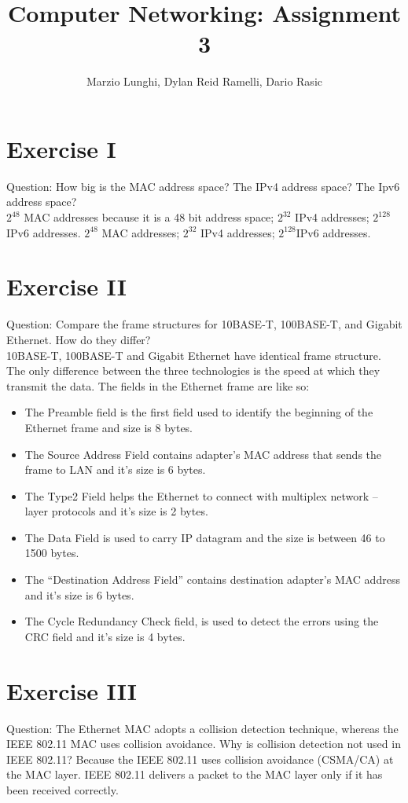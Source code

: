 \documentclass[11pt]{article}
\title{Computer Networking: Assignment 3}
\author{Marzio Lunghi, Dylan Reid Ramelli, Dario Rasic}
\begin{document}
	\maketitle
	\newpage
	\section*{Exercise I}
	Question: How big is the MAC address space? The IPv4 address space? The Ipv6 address space?\\
	$2^{48}$ MAC addresses because it is a 48 bit address space; $2^{32}$ IPv4 addresses; $2^{128}$IPv6 addresses.
	\linebreak
	$2^{48}$ MAC addresses; $2^{32}$ IPv4 addresses; $2^{128}$IPv6 addresses.
	\section*{Exercise II}
	Question: Compare the frame structures for 10BASE-T, 100BASE-T,
	and Gigabit Ethernet. How do they differ?\\
	\linebreak
	10BASE-T, 100BASE-T and Gigabit Ethernet have identical frame structure.
	The only difference between the three technologies is the speed at which they transmit the data.
	The fields in the Ethernet frame are like so:
	\begin{itemize}
			\item 	The Preamble field is the first field used to identify the beginning of the Ethernet frame and size is 8 bytes.
		\item 	The Source Address Field contains adapter’s MAC address that sends the frame to LAN and it's size is 6 bytes.
		\item 	The Type2 Field helps the Ethernet to connect with multiplex network – layer protocols and it's size is 2 bytes.
		\item The Data Field is used to carry IP datagram and the size is between 46 to 1500 bytes.
		\item 	The “Destination Address Field” contains destination adapter’s MAC address and it's size is 6 bytes.
		\item The Cycle Redundancy Check field, is used to detect the errors using the CRC field and it's size is 4 bytes.
	\end{itemize}

	\section*{Exercise III}
	Question: The Ethernet MAC adopts a collision detection technique, whereas the IEEE 802.11 MAC uses collision avoidance. Why is collision detection not used in IEEE 802.11?
	\linebreak
	Because the IEEE 802.11 uses collision avoidance (CSMA/CA) at the MAC layer. IEEE 802.11 delivers a packet to the MAC layer only if it has been received correctly.
\end{document}
